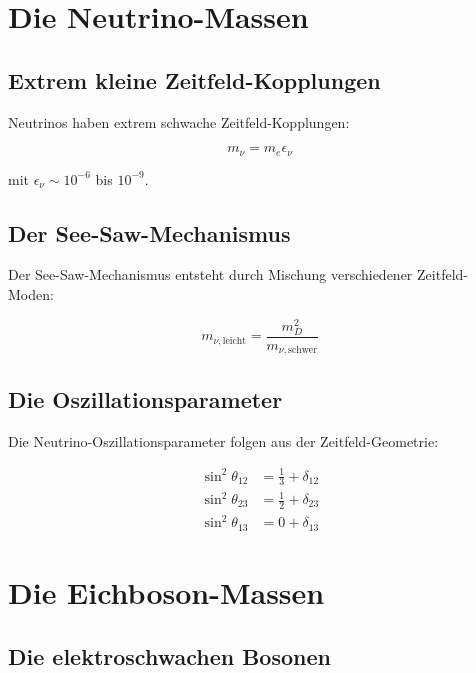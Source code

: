 \documentclass[12pt,a4paper]{report}
\begin{document}
	\section{Die Neutrino-Massen}
	
	\subsection{Extrem kleine Zeitfeld-Kopplungen}
	
	Neutrinos haben extrem schwache Zeitfeld-Kopplungen:
	
	\begin{equation}
		m_\nu = m_e \epsilon_\nu
	\end{equation}
	
	mit $\epsilon_\nu \sim 10^{-6}$ bis $10^{-9}$.
	
	\subsection{Der See-Saw-Mechanismus}
	
	Der See-Saw-Mechanismus entsteht durch Mischung verschiedener Zeitfeld-Moden:
	
	\begin{equation}
		m_{\nu,\text{leicht}} = \frac{m_D^2}{m_{\nu,\text{schwer}}}
	\end{equation}
	
	\subsection{Die Oszillationsparameter}
	
	Die Neutrino-Oszillationsparameter folgen aus der Zeitfeld-Geometrie:
	
	\begin{align}
		\sin^2\theta_{12} &= \frac{1}{3} + \delta_{12} \\
		\sin^2\theta_{23} &= \frac{1}{2} + \delta_{23} \\
		\sin^2\theta_{13} &= 0 + \delta_{13}
	\end{align}
	
	\section{Die Eichboson-Massen}
	
	\subsection{Die elektroschwachen Bosonen}
	
\end{document}
